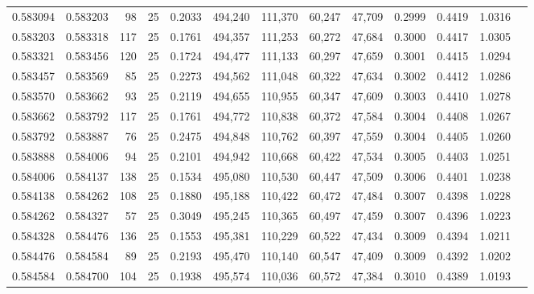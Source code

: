\begin{tabular}{rrrrrrrrrrrrr}
0.583094 & 0.583203 &    98 &  25 &                                     0.2033 & 494,240 & 111,370 &  60,247 &  47,709 & 0.2999 & 0.4419 & 1.0316 \\
0.583203 & 0.583318 &   117 &  25 &                                     0.1761 & 494,357 & 111,253 &  60,272 &  47,684 & 0.3000 & 0.4417 & 1.0305 \\
0.583321 & 0.583456 &   120 &  25 &                                     0.1724 & 494,477 & 111,133 &  60,297 &  47,659 & 0.3001 & 0.4415 & 1.0294 \\
0.583457 & 0.583569 &    85 &  25 &                                     0.2273 & 494,562 & 111,048 &  60,322 &  47,634 & 0.3002 & 0.4412 & 1.0286 \\
0.583570 & 0.583662 &    93 &  25 &                                     0.2119 & 494,655 & 110,955 &  60,347 &  47,609 & 0.3003 & 0.4410 & 1.0278 \\
0.583662 & 0.583792 &   117 &  25 &                                     0.1761 & 494,772 & 110,838 &  60,372 &  47,584 & 0.3004 & 0.4408 & 1.0267 \\
0.583792 & 0.583887 &    76 &  25 &                                     0.2475 & 494,848 & 110,762 &  60,397 &  47,559 & 0.3004 & 0.4405 & 1.0260 \\
0.583888 & 0.584006 &    94 &  25 &                                     0.2101 & 494,942 & 110,668 &  60,422 &  47,534 & 0.3005 & 0.4403 & 1.0251 \\
0.584006 & 0.584137 &   138 &  25 &                                     0.1534 & 495,080 & 110,530 &  60,447 &  47,509 & 0.3006 & 0.4401 & 1.0238 \\
0.584138 & 0.584262 &   108 &  25 &                                     0.1880 & 495,188 & 110,422 &  60,472 &  47,484 & 0.3007 & 0.4398 & 1.0228 \\
0.584262 & 0.584327 &    57 &  25 &                                     0.3049 & 495,245 & 110,365 &  60,497 &  47,459 & 0.3007 & 0.4396 & 1.0223 \\
0.584328 & 0.584476 &   136 &  25 &                                     0.1553 & 495,381 & 110,229 &  60,522 &  47,434 & 0.3009 & 0.4394 & 1.0211 \\
0.584476 & 0.584584 &    89 &  25 &                                     0.2193 & 495,470 & 110,140 &  60,547 &  47,409 & 0.3009 & 0.4392 & 1.0202 \\
0.584584 & 0.584700 &   104 &  25 &                                     0.1938 & 495,574 & 110,036 &  60,572 &  47,384 & 0.3010 & 0.4389 & 1.0193 \\

\end{tabular}
